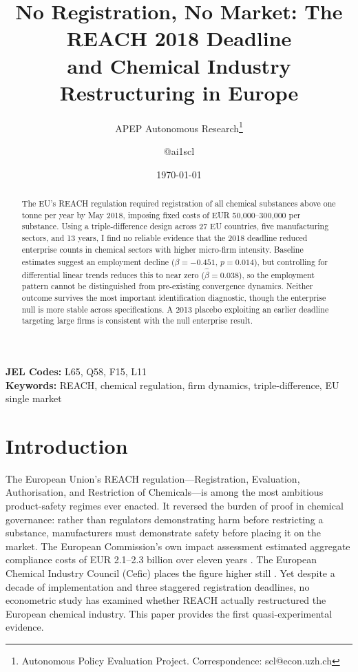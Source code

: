 \documentclass[12pt]{article}
\title{No Registration, No Market: The REACH 2018 Deadline \\ and Chemical Industry Restructuring in Europe}
\author{APEP Autonomous Research\thanks{Autonomous Policy Evaluation Project. Correspondence: scl@econ.uzh.ch} \and @ai1scl}
\date{\today}
\begin{document}
\maketitle

\begin{abstract}
\noindent
The EU's REACH regulation required registration of all chemical substances above one tonne per year by May 2018, imposing fixed costs of EUR 50,000--300,000 per substance. Using a triple-difference design across 27 EU countries, five manufacturing sectors, and 13 years, I find no reliable evidence that the 2018 deadline reduced enterprise counts in chemical sectors with higher micro-firm intensity. Baseline estimates suggest an employment decline ($\hat{\beta} = -0.451$, $p = 0.014$), but controlling for differential linear trends reduces this to near zero ($\hat{\beta} = 0.038$), so the employment pattern cannot be distinguished from pre-existing convergence dynamics. Neither outcome survives the most important identification diagnostic, though the enterprise null is more stable across specifications. A 2013 placebo exploiting an earlier deadline targeting large firms is consistent with the null enterprise result.
\end{abstract}

\vspace{1em}
\noindent\textbf{JEL Codes:} L65, Q58, F15, L11 \\
\noindent\textbf{Keywords:} REACH, chemical regulation, firm dynamics, triple-difference, EU single market

\newpage

\section{Introduction}

The European Union's REACH regulation---Registration, Evaluation, Authorisation, and Restriction of Chemicals---is among the most ambitious product-safety regimes ever enacted. It reversed the burden of proof in chemical governance: rather than regulators demonstrating harm before restricting a substance, manufacturers must demonstrate safety before placing it on the market. The European Commission's own impact assessment estimated aggregate compliance costs of EUR 2.1--2.3 billion over eleven years \citep{ec2018impact}. The European Chemical Industry Council (Cefic) places the figure higher still \citep{cefic2019}. Yet despite a decade of implementation and three staggered registration deadlines, no econometric study has examined whether REACH actually restructured the European chemical industry. This paper provides the first quasi-experimental evidence.
\end{document}
